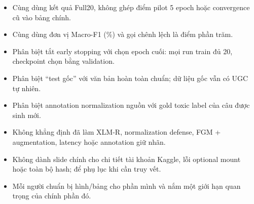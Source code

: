\documentclass[11pt,a4paper]{article}
\begin{document}
\begin{itemize}

\item Cùng dùng kết quả Full20, không ghép điểm pilot 5 epoch hoặc convergence cũ vào bảng chính.

\item Cùng dùng đơn vị Macro-F1 (\%) và gọi chênh lệch là điểm phần trăm.

\item Phân biệt tắt early stopping với chọn epoch cuối: mọi run train đủ 20, checkpoint chọn bằng validation.

\item Phân biệt “test gốc” với văn bản hoàn toàn chuẩn; dữ liệu gốc vẫn có UGC tự nhiên.

\item Phân biệt annotation normalization nguồn với gold toxic label của câu được sinh mới.

\item Không khẳng định đã làm XLM-R, normalization defense, FGM + augmentation, latency hoặc annotation giữ nhãn.

\item Không dành slide chính cho chi tiết tài khoản Kaggle, lỗi optional mount hoặc toàn bộ hash; để phụ lục khi cần truy vết.

\item Mỗi người chuẩn bị hình/bảng cho phần mình và nắm một giới hạn quan trọng của chính phần đó.

\end{itemize}
\end{document}
